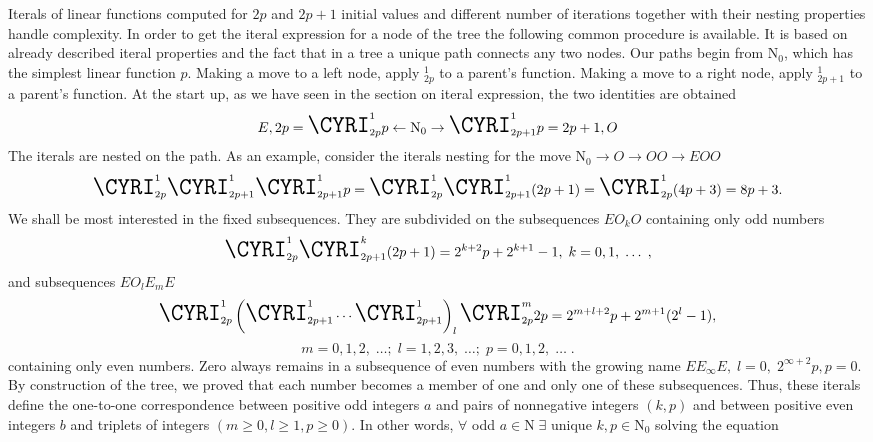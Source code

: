\documentclass{article}
\begin{document}
Iterals of linear functions computed for $2p$ and $2p + 1$ initial values and different number of iterations together with their nesting properties handle complexity. In order to get the iteral expression for a node of the tree the following common procedure is available. It is based on already described iteral properties and the fact that in a tree a unique path connects any two nodes. Our paths begin from $\mathrm{N_0}$, which has the simplest linear function $p$. Making a move to a left node, apply \CYRI$_{2p}^{1}$ to a parent's function. Making a move to a right node, apply \CYRI$_{2p+1}^{1}$ to a parent's function. At the start up, as we have seen in the section on iteral expression, the two identities are obtained
\begin{displaymath}
E, 2p = \textrm{\LARGE{\CYRI}}_{2p}^{1}p \gets \mathrm{N_0} \to \textrm{\LARGE{\CYRI}}_{2p+1}^{1}p = 2p+1, O
\end{displaymath}
The iterals are nested on the path. As an example, consider the iterals nesting for the move $\mathrm{N_0}\to O \to OO \to EOO$
\begin{displaymath}
\textrm{\LARGE{\CYRI}}_{2p}^{1}\textrm{\LARGE{\CYRI}}_{2p+1}^{1}\textrm{\LARGE{\CYRI}}_{2p+1}^{1}p =
\textrm{\LARGE{\CYRI}}_{2p}^{1}\textrm{\LARGE{\CYRI}}_{2p+1}^{1}(2p+1) = 
\textrm{\LARGE{\CYRI}}_{2p}^{1}(4p+3) = 8p + 3.
\end{displaymath}
We shall be most interested in the fixed subsequences. They are subdivided on the subsequences $EO_k{O}$ containing only odd numbers
\begin{displaymath}
\textrm{\LARGE{\CYRI}}_{2p}^{1}
\textrm{\LARGE{\CYRI}}_{2p+1}^{k}(2p+1) = 2^{k+2}p+2^{k+1}-1, \; k = 0, 1, \; \ldots \; ,
\end{displaymath}
and subsequences $EO_l{E}_m{E}$
\begin{displaymath}
\textrm{\LARGE{\CYRI}}_{2p}^{1}\left(\textrm{\LARGE{\CYRI}}_{2p+1}^{1}\cdots
\textrm{\LARGE{\CYRI}}_{2p+1}^{1}\right)_{l}
\textrm{\LARGE{\CYRI}}_{2p}^{m}2p = 2^{m + l + 2}p + 2^{m+1}(2^l -1),
\end{displaymath}
\begin{displaymath}
m = 0, 1, 2, \; \ldots; \; l = 1, 2, 3, \; \ldots; \; p = 0, 1, 2, \; \dots \; .
\end{displaymath}
containing only even numbers. Zero always remains in a subsequence of even numbers with the growing name $EE_{\infty}E, \; l = 0, \; 2^{\infty+2}p, p=0$. By construction of the tree, we proved that each number becomes a member of one and only one of these subsequences. Thus, these iterals define the one-to-one correspondence between positive odd integers $a$ and pairs of nonnegative integers $(k, p)$ and between positive even integers $b$ and triplets of integers $(m \geq 0, l \geq 1, p \geq 0)$. In other words, $\forall$ odd $a \in \mathrm{N} \; \exists$ unique $k,p \in \mathrm{N_0}$ solving the equation
\end{document}

